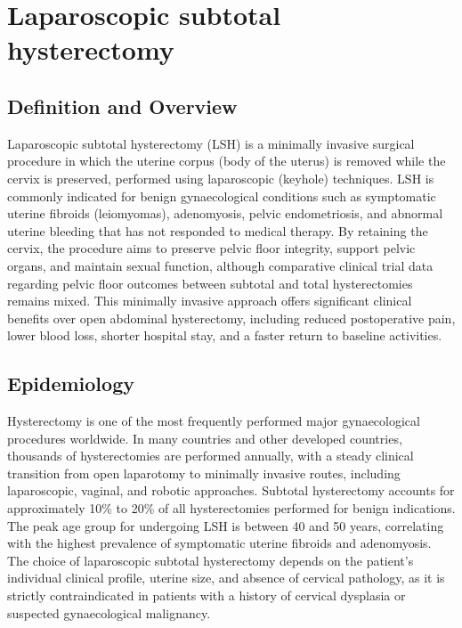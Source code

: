 \chapter{Laparoscopic subtotal hysterectomy}

\section*{Definition and Overview}
Laparoscopic subtotal hysterectomy (LSH) is a minimally invasive surgical procedure in which the uterine corpus (body of the uterus) is removed while the cervix is preserved, performed using laparoscopic (keyhole) techniques. LSH is commonly indicated for benign gynaecological conditions such as symptomatic uterine fibroids (leiomyomas), adenomyosis, pelvic endometriosis, and abnormal uterine bleeding that has not responded to medical therapy. By retaining the cervix, the procedure aims to preserve pelvic floor integrity, support pelvic organs, and maintain sexual function, although comparative clinical trial data regarding pelvic floor outcomes between subtotal and total hysterectomies remains mixed. This minimally invasive approach offers significant clinical benefits over open abdominal hysterectomy, including reduced postoperative pain, lower blood loss, shorter hospital stay, and a faster return to baseline activities.

\section*{Epidemiology}
Hysterectomy is one of the most frequently performed major gynaecological procedures worldwide. In many countries and other developed countries, thousands of hysterectomies are performed annually, with a steady clinical transition from open laparotomy to minimally invasive routes, including laparoscopic, vaginal, and robotic approaches. Subtotal hysterectomy accounts for approximately 10\% to 20\% of all hysterectomies performed for benign indications. The peak age group for undergoing LSH is between 40 and 50 years, correlating with the highest prevalence of symptomatic uterine fibroids and adenomyosis. The choice of laparoscopic subtotal hysterectomy depends on the patient's individual clinical profile, uterine size, and absence of cervical pathology, as it is strictly contraindicated in patients with a history of cervical dysplasia or suspected gynaecological malignancy.


